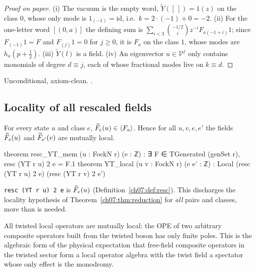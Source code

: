 \begin{proof}[Proof on paper]
(i) The vacuum is the empty word, $\widetilde Y([\,]) = 1(z)$ on the class $0$, whose only mode
is $1_{(-1)} = \mathrm{id}$, i.e.\ $k = 2\cdot(-1)+0 = -2$. (ii) For the one-letter word
$[(0,a)]$ the defining sum is $\sum_{i<3}\binom{-1/2}{i}z^{-i}F_{a(-1+i)}1$; since
$F_{(-1)}1 = F$ and $F_{(j)}1 = 0$ for $j\ge0$, it is $F_a$ on the class $1$, whose modes are
$h_a(p+\frac12)$. (iii) $\widetilde Y(l)$ is a field. (iv) An eigenvector $u\in\mathcal V^j$ only
contains monomials of degree $d\equiv j$, each of whose fractional modes live on $k\equiv d$.
\end{proof}

\begin{status}
Unconditional, axiom-clean. .
\end{status}

\subsection{Locality of all rescaled fields}

\begin{theorem}\label{ch07:thm:YTlocal}
For every state $u$ and class $e$, $\widetilde{F}_e(u)\in\langle F_a\rangle$. Hence for all
$u, v, e, e'$ the fields $\widetilde{F}_e(u)$ and $\widetilde{F}_{e'}(v)$ are mutually local.
\end{theorem}

\begin{leancode}
theorem resc_YT_mem (u : FockN r) (e : ℤ) :
    ∃ F ∈ TGenerated (genSet r), resc (YT r u) 2 e = F.1
theorem YT_local (u v : FockN r) (e e' : ℤ) :
    Local (resc (YT r u) 2 e) (resc (YT r v) 2 e')
\end{leancode}

\begin{dictionary}
\verb|resc (YT r u) 2 e| is $\widetilde{F}_e(u)$ (Definition~\ref{ch07:def:resc}). This discharges
the locality hypothesis of Theorem~\ref{ch07:thm:reduction} for \emph{all} pairs and classes, more
than is needed.
\end{dictionary}

\begin{physics}
All twisted local operators are mutually local: the OPE of two arbitrary composite operators built from the twisted boson has only finite poles. This is the algebraic form of the physical expectation that free-field composite operators in the twisted sector form a local operator algebra with the twist field a spectator whose only effect is the monodromy.
\end{physics}

